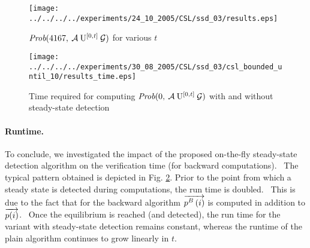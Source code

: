 \documentclass[times, 10pt,twocolumn]{article}
\begin{document}
		\begin{figure}[ht!]
			\begin{center}
				\texttt{[image: ../../../../experiments/24\_10\_2005/CSL/ssd\_03/results.eps]}
				\vspace{-0.4cm}
				\caption{{\small $\mbox{\it Prob}(4167, \: \mathcal{A} \: \mathrm{U}^{[0,t]} \: \mathcal{G} )$ for various $t$ \label{gr:prob_5}}}
			\end{center}
			\vspace{-0.8cm}
		\end{figure}
		\begin{figure}[ht!]
			\begin{center}
				\texttt{[image: ../../../../experiments/30\_08\_2005/CSL/ssd\_03/csl\_bounded\_until\_10/results\_time.eps]}
				\vspace{-0.4cm}
				\caption{{\small Time required for computing $\mbox{\it Prob}(0, \: \mathcal{A} \: \mathrm{U}^{[0,t]} \: \mathcal{G} )$ with and without steady-state detection \label{gr:prob_4}}}
			\end{center}
			\vspace{-0.8cm}
		\end{figure}
	
	\paragraph{Runtime.}
		To conclude, we investigated the impact of the proposed on-the-fly steady-state detection algorithm on the verification time (for backward computations).  The typical pattern obtained is depicted in Fig. \ref{gr:prob_4}. Prior to the point from which a steady state is detected during computations, the run time is doubled.  This is due to the fact that for the backward algorithm $\overrightarrow{p^{B}\left( i \right)}$ is computed in addition to $\overrightarrow{p(i)}$.  Once the equilibrium is reached (and detected), the run time for the variant with steady-state detection remains constant, whereas the runtime of the plain algorithm continues to grow linearly in $t$.

{}
\end{document}

